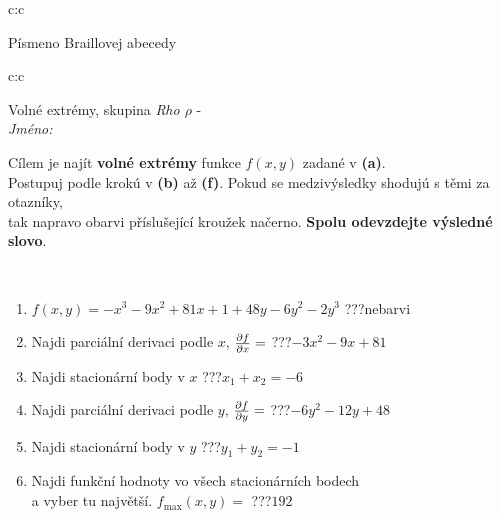 \documentclass[10pt]{report}
\begin{document}
\begin{tabular}{c:c}
\begin{minipage}[c][104.5mm][t]{0.5\linewidth}
\begin{center}
\begin{minipage}{0.20\linewidth}
\begin{center}
{\small Písmeno Braillovej abecedy}
\end{center}
\end{minipage}
\end{center}
\end{minipage}
%
\end{tabular}
\newpage
\thispagestyle{empty}
\begin{tabular}{c:c}
\begin{minipage}[c][104.5mm][t]{0.5\linewidth}
\begin{center}
\vspace{7mm}
{\huge Volné extrémy, skupina \textit{Rho $\rho$} -}\\[5mm]
\textit{Jméno:}\phantom{xxxxxxxxxxxxxxxxxxxxxxxxxxxxxxxxxxxxxxxxxxxxxxxxxxxxxxxxxxxxxxxxx}\\[5mm]
\begin{minipage}{0.95\linewidth}
\begin{center}
Cílem je najít \textbf{volné extrémy} funkce $f(x,y)$ zadané v \textbf{(a)}.\\Postupuj podle krokú v \textbf{(b)} až \textbf{(f)}. Pokud se medzivýsledky shodujú s těmi za otazníky,\\tak napravo obarvi příslušející kroužek načerno. \textbf{Spolu odevzdejte výsledné slovo}.
\end{center}
\end{minipage}
\\[1mm]
\begin{minipage}{0.79\linewidth}
\begin{center}
\begin{varwidth}{\linewidth}
\begin{enumerate}
\normalsize
\item $f(x,y)=-x^3-9x^2+81x+1+48y-6y^2-2y^3$\quad \dotfill\; ???\;\dotfill \quad nebarvi
\item Najdi parciální derivaci podle $x$, $\pdv{f}{x}=$\quad \dotfill\; ???\;\dotfill \quad $-3x^2-9x+81$
\item Najdi stacionární body v $x$\quad \dotfill\; ???\;\dotfill \quad $x_1+x_2=-6$
\item Najdi parciální derivaci podle $y$, $\pdv{f}{y}=$\quad \dotfill\; ???\;\dotfill \quad $-6y^2-12y+48$
\item Najdi stacionární body v $y$\quad \dotfill\; ???\;\dotfill \quad $y_1+y_2=-1$
\item Najdi funkční hodnoty vo všech stacionárních bodech \\ \phantom{xxxxxx} a vyber tu najvětší. $f_{\text{max}}(x,y)=$\quad \dotfill\; ???\;\dotfill \quad $192$

\end{enumerate}
\end{varwidth}
\end{center}
\end{minipage}
\end{center}
\end{minipage}
\end{tabular}
\end{document}
